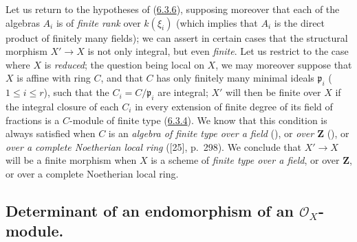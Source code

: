 \begin{remark}[6.3.10]
\label{II.6.3.10}
Let us return to the hypotheses of (\hyperref[II.6.3.6]{6.3.6}),
supposing moreover that each of the algebras $A_i$ is of \emph{finite rank}
over $k(\xi_i)$ (which implies that $A_i$ is the direct product of finitely
many fields); we can assert in certain cases that the structural morphism
$X'\to X$ is not only integral, but even \emph{finite}. Let us restrict to
the case where $X$ is \emph{reduced}; the question being local on $X$, we may
moreover suppose that $X$ is affine with ring $C$, and that $C$ has only
finitely many minimal ideals $\mathfrak{p}_i$ ($1\leq i\leq r$), such that
the $C_i=C/\mathfrak{p}_i$ are integral; $X'$ will then be finite over $X$ if
the integral closure of each $C_i$ in every extension of finite degree of its
field of fractions is a $C$-module of finite type
(\hyperref[II.6.3.4]{6.3.4}). We know that this condition is always
satisfied when $C$ is an \emph{algebra of finite type over a field}
(\cite[vol.~I, p.~267, Theorem~9]{I-13}), or \emph{over $\mathbf{Z}$}
(\cite[vol.~I, p.~93, Theorem~3]{I-9}), or \emph{over a complete Noetherian
local ring} ([25], p.~298). We conclude that $X'\to X$ will be a finite
morphism when $X$ is a scheme of \emph{finite type over a field}, or over
$\mathbf{Z}$, or over a complete Noetherian local ring.
\end{remark}

\subsection{Determinant of an endomorphism of an $\mathcal{O}_X$-module.}
\label{subsection:II.6.4}


